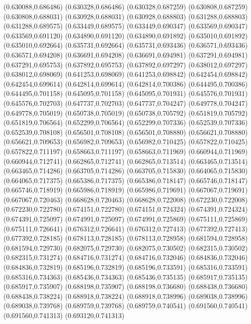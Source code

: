 (0.630088,0.686486)
(0.630328,0.686486)
(0.630328,0.687259)
(0.630808,0.687259)
(0.630808,0.688031)
(0.630928,0.688031)
(0.630928,0.688803)
(0.631288,0.688803)
(0.631288,0.689575)
(0.633449,0.689575)
(0.633449,0.690347)
(0.633569,0.690347)
(0.633569,0.691120)
(0.634890,0.691120)
(0.634890,0.691892)
(0.635010,0.691892)
(0.635010,0.692664)
(0.635731,0.692664)
(0.635731,0.693436)
(0.636571,0.693436)
(0.636571,0.694208)
(0.636691,0.694208)
(0.636691,0.694981)
(0.637291,0.694981)
(0.637291,0.695753)
(0.637892,0.695753)
(0.637892,0.697297)
(0.638012,0.697297)
(0.638012,0.698069)
(0.641253,0.698069)
(0.641253,0.698842)
(0.642454,0.698842)
(0.642454,0.699614)
(0.642814,0.699614)
(0.642814,0.700386)
(0.644495,0.700386)
(0.644495,0.701158)
(0.645095,0.701158)
(0.645095,0.701931)
(0.645576,0.701931)
(0.645576,0.702703)
(0.647737,0.702703)
(0.647737,0.704247)
(0.649778,0.704247)
(0.649778,0.705019)
(0.650738,0.705019)
(0.650738,0.705792)
(0.651819,0.705792)
(0.651819,0.706564)
(0.652299,0.706564)
(0.652299,0.707336)
(0.652539,0.707336)
(0.652539,0.708108)
(0.656501,0.708108)
(0.656501,0.708880)
(0.656621,0.708880)
(0.656621,0.709653)
(0.656982,0.709653)
(0.656982,0.710425)
(0.657822,0.710425)
(0.657822,0.711197)
(0.658663,0.711197)
(0.658663,0.711969)
(0.660944,0.711969)
(0.660944,0.712741)
(0.662865,0.712741)
(0.662865,0.713514)
(0.663465,0.713514)
(0.663465,0.714286)
(0.663705,0.714286)
(0.663705,0.715830)
(0.664065,0.715830)
(0.664065,0.717375)
(0.665386,0.717375)
(0.665386,0.718147)
(0.665746,0.718147)
(0.665746,0.718919)
(0.665986,0.718919)
(0.665986,0.719691)
(0.667067,0.719691)
(0.667067,0.720463)
(0.668628,0.720463)
(0.668628,0.722008)
(0.672230,0.722008)
(0.672230,0.722780)
(0.674151,0.722780)
(0.674151,0.724324)
(0.674391,0.724324)
(0.674391,0.725097)
(0.674991,0.725097)
(0.674991,0.725869)
(0.675111,0.725869)
(0.675111,0.726641)
(0.676312,0.726641)
(0.676312,0.727413)
(0.677392,0.727413)
(0.677392,0.728185)
(0.678113,0.728185)
(0.678113,0.728958)
(0.681594,0.728958)
(0.681594,0.729730)
(0.682075,0.729730)
(0.682075,0.730502)
(0.682315,0.730502)
(0.682315,0.731274)
(0.684716,0.731274)
(0.684716,0.732046)
(0.684836,0.732046)
(0.684836,0.732819)
(0.685196,0.732819)
(0.685196,0.733591)
(0.685316,0.733591)
(0.685316,0.734363)
(0.685436,0.734363)
(0.685436,0.735135)
(0.685917,0.735135)
(0.685917,0.735907)
(0.688198,0.735907)
(0.688198,0.736680)
(0.688438,0.736680)
(0.688438,0.738224)
(0.688918,0.738224)
(0.688918,0.738996)
(0.689038,0.738996)
(0.689038,0.739768)
(0.689759,0.739768)
(0.689759,0.740541)
(0.691560,0.740541)
(0.691560,0.741313)
(0.693120,0.741313)
